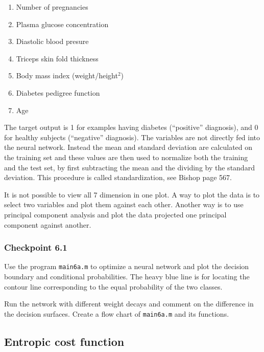 \documentclass[12pt]{article}    %
\begin{document}
\begin{enumerate}
\item Number of pregnancies
\item Plasma glucose concentration
\item Diastolic blood presure
\item Triceps skin fold thickness
\item Body mass index (weight/height$^2$)
\item Diabetes pedigree function
\item Age
\end{enumerate}


The target output is 1 for examples having diabetes (``positive'' diagnosis), and 0 for healthy subjects (``negative'' diagnosis).
The variables are not directly fed into the neural network. Instead
the mean and standard deviation are calculated on the training set and
these values are then used to normalize both the training and
the test set, by first subtracting the mean and the dividing by the standard deviation. This procedure is called standardization, see Bishop page 567.

It is not possible to view all 7 dimension in one plot.
A way to plot the data is to select two variables and plot them against
each other.
Another way is to use principal component analysis and plot the data projected one principal component against another.

\subsubsection*{Checkpoint 6.1}

Use the program {\tt main6a.m} to optimize a neural network and plot
the decision boundary and conditional probabilities. The heavy blue line is
for locating the contour line corresponding to the equal probability of the two
classes.

Run the network with different weight decays and comment on the difference in the
decision surfaces.
Create a flow chart of {\tt main6a.m} and its functions.


\subsection*{Entropic cost function}
\end{document}
